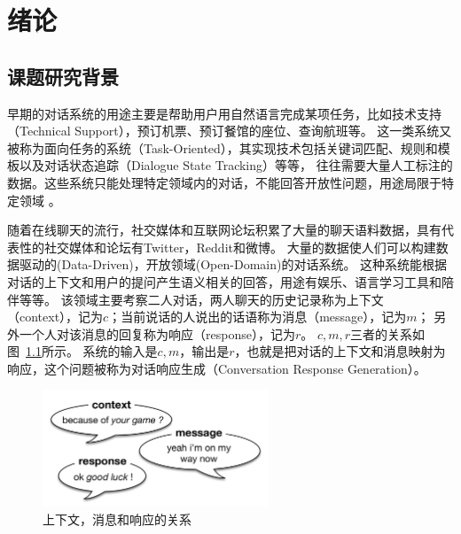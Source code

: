 
\chapter{绪论}\label{ch:introduction}

\section{课题研究背景}\label{sec:research_background}
早期的对话系统的用途主要是帮助用户用自然语言完成某项任务，比如技术支持（Technical Support），预订机票、预订餐馆的座位、查询航班等。
这一类系统又被称为面向任务的系统（Task-Oriented），其实现技术包括关键词匹配、规则和模板以及对话状态追踪（Dialogue State Tracking）等等，
往往需要大量人工标注的数据。这些系统只能处理特定领域内的对话，不能回答开放性问题，用途局限于特定领域
。

随着在线聊天的流行，社交媒体和互联网论坛积累了大量的聊天语料数据，具有代表性的社交媒体和论坛有Twitter，Reddit和微博。
大量的数据使人们可以构建数据驱动的(Data-Driven)，开放领域(Open-Domain)的对话系统。
这种系统能根据对话的上下文和用户的提问产生语义相关的回答，用途有娱乐、语言学习工具和陪伴等等。
该领域主要考察二人对话，两人聊天的历史记录称为上下文（context），记为$c$；当前说话的人说出的话语称为消息（message），记为$m$；
另外一个人对该消息的回复称为响应（response），记为$r$。
$c,m,r$三者的关系如图~\ref{fig:context_message_response}所示。
系统的输入是$c,m$，输出是$r$，也就是把对话的上下文和消息映射为响应，这个问题被称为对话响应生成（Conversation Response Generation）。

\begin{figure}[H]
    \includegraphics[width=0.6\textwidth]{figure/context_message_response.png}
    \centering
    \caption{上下文，消息和响应的关系}
    \label{fig:context_message_response}
\end{figure}

